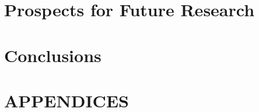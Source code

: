 \documentclass[letterpaper,12pt,titlepage,oneside,final]{report}
\newcommand{\href}[1]{#1} %
\begin{document}




\chapter{Prospects for Future Research}
\chapter{Conclusions}

\appendix
\chapter*{APPENDICES}

\end{document}
